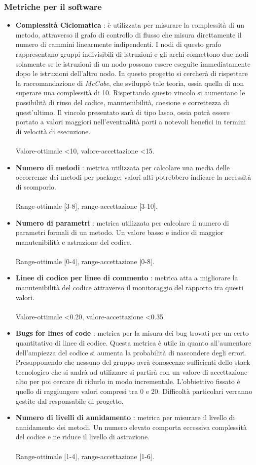 \subsubsection{Metriche per il software}
\begin{itemize}
\item \textbf{Complessità Ciclomatica} \textnormal{: è utilizzata per misurare la complessità di un metodo, attraverso il grafo di controllo di flusso che misura direttamente il numero di cammini linearmente indipendenti. I nodi di questo grafo rappresentano gruppi indivisibili di istruzioni e gli archi connettono due nodi solamente se le istruzioni di un nodo possono essere eseguite immediatamente dopo le istruzioni dell'altro nodo.
In questo progetto si cercherà di rispettare la raccomandazione di \textit{McCabe}, che sviluppò tale teoria, ossia quella di non superare una complessità di 10. Rispettando questo vincolo si aumentano le possibilità di riuso del codice, manutenibilità, coesione e correttezza di quest'ultimo. Il vincolo presentato sarà di tipo lasco, ossia potrà essere portato a valori maggiori nell'eventualità porti a notevoli benefici in termini di velocità di esecuzione.
\\
	\\Valore-ottimale <10, valore-accettazione <15.}
\item \textbf{Numero di metodi} \textnormal{: metrica utilizzata per calcolare una media delle occorrenze dei metodi per package; valori alti potrebbero indicare la necessità di scomporlo.
\\
	\\Range-ottimale [3-8], range-accettazione [3-10].}
\item \textbf{Numero di parametri} \textnormal{: metrica utilizzata per calcolare il numero di parametri formali di un metodo. Un valore basso e indice di maggior manutenibilità e astrazione del codice.
\\	
	\\Range-ottimale [0-4], range-accettazione [0-8].}
\item \textbf{Linee di codice per linee di commento} \textnormal{: metrica atta a migliorare la manutenibilità del codice attraverso il monitoraggio del rapporto tra questi valori.
\\
	\\Valore-ottimale <0.20, valore-accettazione <0.35}
\item \textbf{Bugs for lines of code} \textnormal{: metrica per la misura dei bug trovati per un certo quantitativo di linee di codice. Questa metrica è utile in quanto all'aumentare dell'ampiezza del codice si aumenta la probabilità di nascondere degli errori. Presupponendo che nessuno del gruppo avrà conoscenze sufficienti dello stack tecnologico che si andrà ad utilizzare si partirà con un valore di accettazione alto per poi cercare di ridurlo in modo incrementale. L'obbiettivo fissato è quello di raggiungere valori compresi tra 0 e 20. Difficoltà particolari verranno gestite dal responsabile di progetto.}
\item \textbf{Numero di livelli di annidamento} \textnormal{: metrica per misurare il livello di annidamento dei metodi. Un numero elevato comporta eccessiva complessità del codice e ne riduce il livello di astrazione.
\\	
	\\Range-ottimale [1-4], range-accettazione [1-6].}
\end{itemize}